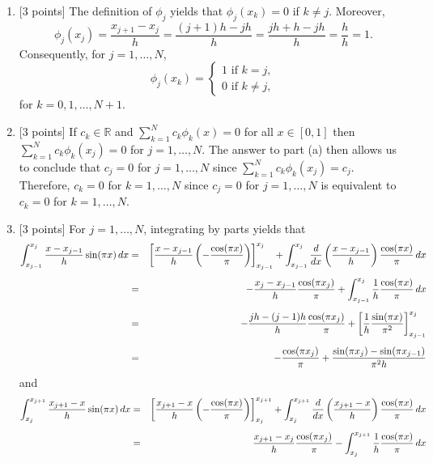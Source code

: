 \begin{solution}
\begin{enumerate}
\item {[3 points]} The definition of $\phi_j$ yields that $\phi_j(x_k)=0$ if $k\ne j$. Moreover,
\[\phi_j(x_j)=\frac{x_{j+1}-x_j}{h}=\frac{(j+1)h-jh}{h}=\frac{jh+h-jh}{h}=\frac{h}{h}=1.\]
Consequently, for $j=1,\ldots,N$,
\[ \phi_j(x_k) = \left\{ \begin{array}{l}
1\mbox{ if }k=j, \\
0\mbox{ if }k\ne j,
\end{array}\right. \]
for $k=0,1,\ldots,N+1$.
\\
\item {[3 points]} If $c_k\in\mathbb{R}$ and $\displaystyle{\sum_{k=1}^N}c_k\phi_k(x)=0$ for all $x\in[0,1]$ then $\displaystyle{\sum_{k=1}^N}c_k\phi_k(x_j)=0$ for $j=1,\ldots,N$. The answer to part (a) then allows us to conclude that $c_j=0$ for $j=1,\ldots,N$ since $\displaystyle{\sum_{k=1}^N}c_k\phi_k(x_j)=c_j$. Therefore, $c_k=0$ for $k=1,\ldots,N$ since $c_j=0$ for $j=1,\ldots,N$ is equivalent to $c_k=0$ for $k=1,\ldots,N$.
\\
\item {[3 points]} For $j=1,\ldots,N$, integrating by parts yields that
          \begin{eqnarray*}
\int_{x_{j-1}}^{x_j} {x-x_{j-1} \over h} \sin(\pi x)\, dx&=&\left[{x-x_{j-1} \over h}\left(-{\cos(\pi x) \over \pi}\right)\right]_{x_{j-1}}^{x_j}+\int_{x_{j-1}}^{x_j}\frac{d}{dx}\left({x-x_{j-1} \over h}\right) {\cos(\pi x) \over \pi}\, dx \\[0.5em]
&=&-{x_j-x_{j-1} \over h}{\cos(\pi x_j) \over \pi}+\int_{x_{j-1}}^{x_j}{1 \over h}{\cos(\pi x) \over \pi}\, dx\\[0.5em]
&=&-{jh-(j-1)h \over h}{\cos(\pi x_j) \over \pi}+\left[{1 \over h}{\sin(\pi x) \over \pi^2}\right]_{x_{j-1}}^{x_j}\\[0.5em]
&=&-{\cos(\pi x_j) \over \pi}+{\sin(\pi x_j)-\sin(\pi x_{j-1}) \over \pi^2h}
         \end{eqnarray*} 
and
          \begin{eqnarray*}
\int_{x_j}^{x_{j+1}} {x_{j+1}-x \over h} \sin(\pi x)\, dx&=&\left[{x_{j+1}-x \over h}\left(-{\cos(\pi x) \over \pi}\right)\right]_{x_j}^{x_{j+1}}+\int_{x_j}^{x_{j+1}}\frac{d}{dx}\left({x_{j+1}-x \over h}\right) {\cos(\pi x) \over \pi}\, dx \\[0.5em]
&=&{x_{j+1}-x_j \over h}{\cos(\pi x_j) \over \pi}-\int_{x_j}^{x_{j+1}}{1 \over h}{\cos(\pi x) \over \pi}\, dx\\[0.5em]

\end{eqnarray*}
\end{enumerate}
\end{solution}
